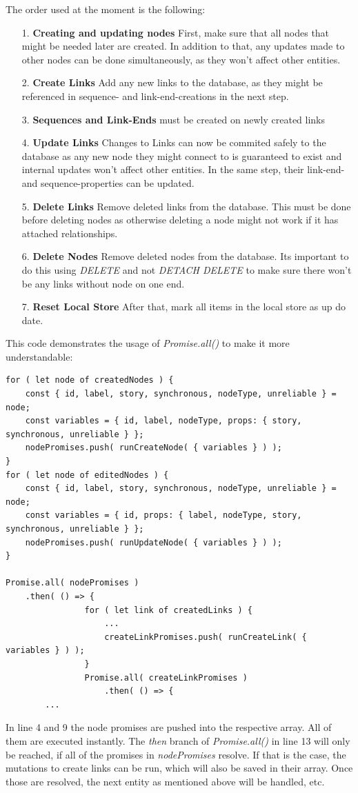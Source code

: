 The order used at the moment is the following:
\begin{itemize}
\item[1.] \textbf{Creating and updating nodes} First, make sure that all nodes that might be needed later are created. In addition to that, any updates made to other nodes can be done simultaneously, as they won't affect other entities.
\item[2.] \textbf{Create Links} Add any new links to the database, as they might be referenced in sequence- and link-end-creations in the next step.
\item[3.] \textbf{Sequences and Link-Ends} must be created on newly created links
\item[4.] \textbf{Update Links} Changes to Links can now be commited safely to the database as any new node they might connect to is guaranteed to exist and internal updates won't affect other entities. In the same step, their link-end- and sequence-properties can be updated.
\item[5.] \textbf{Delete Links} Remove deleted links from the database. This must be done before deleting nodes as otherwise deleting a node might not work if it has attached relationships.
\item[6.] \textbf{Delete Nodes} Remove deleted nodes from the database. Its important to do this using \emph{DELETE} and not \emph{DETACH DELETE} to make sure there won't be any links without node on one end.
\item[7.] \textbf{Reset Local Store} After that, mark all items in the local store as up do date.
\end{itemize}

This code demonstrates the usage of \emph{Promise.all()} to make it more understandable:
\begin{lstlisting}[caption={Usage of Promise.all()}]
for ( let node of createdNodes ) {
	const { id, label, story, synchronous, nodeType, unreliable } = node;
	const variables = { id, label, nodeType, props: { story, synchronous, unreliable } };
	nodePromises.push( runCreateNode( { variables } ) );
}
for ( let node of editedNodes ) {
	const { id, label, story, synchronous, nodeType, unreliable } = node;
	const variables = { id, props: { label, nodeType, story, synchronous, unreliable } };
	nodePromises.push( runUpdateNode( { variables } ) );
}

Promise.all( nodePromises ) 
	.then( () => {
				for ( let link of createdLinks ) {
					...
					createLinkPromises.push( runCreateLink( { variables } ) );				
				}
				Promise.all( createLinkPromises )
					.then( () => {	
		...
\end{lstlisting}
In line 4 and 9 the node promises are pushed into the respective array. All of them are executed instantly. The \emph{then} branch of \emph{Promise.all()} in line 13 will only be reached, if all of the promises in \emph{nodePromises} resolve. If that is the case, the mutations to create links can be run, which will also be saved in their array. Once those are resolved, the next entity as mentioned above will be handled, etc.

